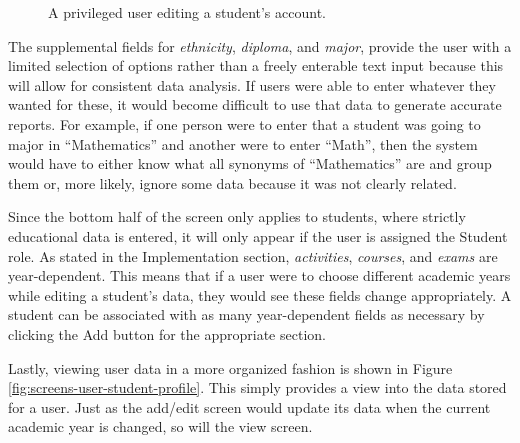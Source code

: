 \begin{figure}[h!]
	\centering
	\caption{A privileged user editing a student's account.}
	\label{fig:screens-user-student-edit}
\end{figure}

The supplemental fields for \emph{ethnicity}, \emph{diploma}, and \emph{major}, provide the user with a limited selection of options rather than a freely enterable text input because this will allow for consistent data analysis. If users were able to enter whatever they wanted for these, it would become difficult to use that data to generate accurate reports. For example, if one person were to enter that a student was going to major in ``Mathematics'' and another were to enter ``Math'', then the system would have to either know what all synonyms of ``Mathematics'' are and group them or, more likely, ignore some data because it was not clearly related.

Since the bottom half of the screen only applies to students, where strictly educational data is entered, it will only appear if the user is assigned the Student role. As stated in the Implementation section, \emph{activities}, \emph{courses}, and \emph{exams} are year-dependent. This means that if a user were to choose different academic years while editing a student's data, they would see these fields change appropriately. A student can be associated with as many year-dependent  fields as necessary by clicking the Add button for the appropriate section.

Lastly, viewing user data in a more organized fashion is shown in Figure \ref{fig:screens-user-student-profile}. This simply provides a view into the data stored for a user. Just as the add/edit screen would update its data when the current academic year is changed, so will the view screen.

